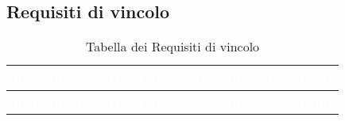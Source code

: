 \renewcommand{\o}{Obbligatorio}
\renewcommand{\d}{Desiderabile}
\subsection{Requisiti di vincolo}
{
\renewcommand{\arraystretch}{2}
\centering
\begin{longtable}{ c C{8cm} c c}
\caption{Tabella dei Requisiti di vincolo}\\
\textcolor{white}{\textbf{Identificativo}} & \textcolor{white}{\textbf{Descrizione}} & \textcolor{white}{\textbf{Classificazione}} & \textcolor{white}{\textbf{Fonti}}\\	
\endfirsthead
{}
\textcolor{white}{\textbf{Identificativo}} & \textcolor{white}{\textbf{Descrizione}} & \textcolor{white}{\textbf{Classificazione}} & \textcolor{white}{\textbf{Fonti}}\\
\endhead


\end{longtable}}
